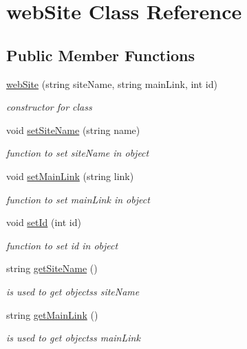 \hypertarget{classwebSite}{}\section{web\+Site Class Reference}
\label{classwebSite}
\subsection*{Public Member Functions}
\begin{DoxyCompactItemize}
\item 
\hyperlink{classwebSite_a8c9a9a0b8a5b24d1dd443924a92454a2}{web\+Site} (string site\+Name, string main\+Link, int id)
\begin{DoxyCompactList}\small\item\em constructor for class \end{DoxyCompactList}\item 
void \hyperlink{classwebSite_aca75cc0b212650bd873fd2e7db1a2e2c}{set\+Site\+Name} (string name)
\begin{DoxyCompactList}\small\item\em function to set site\+Name in object \end{DoxyCompactList}\item 
void \hyperlink{classwebSite_a3ad361449285b0274d109c6e59e5aa74}{set\+Main\+Link} (string link)
\begin{DoxyCompactList}\small\item\em function to set main\+Link in object \end{DoxyCompactList}\item 
void \hyperlink{classwebSite_a751ffb27dc24de4bd8656c3e8e949fa7}{set\+Id} (int id)
\begin{DoxyCompactList}\small\item\em function to set id in object \end{DoxyCompactList}\item 
string \hyperlink{classwebSite_ad74bed1a5bf504c6fc49ac4f6489f677}{get\+Site\+Name} ()
\begin{DoxyCompactList}\small\item\em is used to get objects\textquotesingle{}s site\+Name \end{DoxyCompactList}\item 
string \hyperlink{classwebSite_a631d0e50f03ae59258a55cf3056f00c8}{get\+Main\+Link} ()
\begin{DoxyCompactList}\small\item\em is used to get objects\textquotesingle{}s main\+Link \end{DoxyCompactList}\item 

\end{DoxyCompactItemize}
